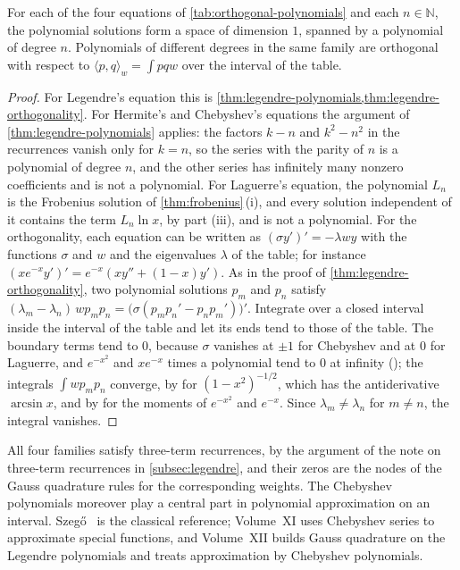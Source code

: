 \begin{proposition}
\label{prop:classical-polynomials}
For each of the four equations of \cref{tab:orthogonal-polynomials} and each $n\in\mathbb N$, the polynomial solutions form a space of dimension $1$, spanned by a polynomial of degree $n$. Polynomials of different degrees in the same family are orthogonal with respect to $\langle p,q\rangle_w=\int pqw$ over the interval of the table.
\end{proposition}

\begin{proof}
For Legendre's equation this is \cref{thm:legendre-polynomials,thm:legendre-orthogonality}. For Hermite's and Chebyshev's equations the argument of \cref{thm:legendre-polynomials} applies: the factors $k-n$ and $k^2-n^2$ in the recurrences vanish only for $k=n$, so the series with the parity of $n$ is a polynomial of degree $n$, and the other series has infinitely many nonzero coefficients and is not a polynomial. For Laguerre's equation, the polynomial $L_n$ is the Frobenius solution of \cref{thm:frobenius}\,(i), and every solution independent of it contains the term $L_n\ln x$, by part (iii), and is not a polynomial. For the orthogonality, each equation can be written as $(\sigma y')'=-\lambda wy$ with the functions $\sigma$ and $w$ and the eigenvalues $\lambda$ of the table; for instance $(xe^{-x}y')'=e^{-x}(xy''+(1-x)y')$. As in the proof of \cref{thm:legendre-orthogonality}, two polynomial solutions $p_m$ and $p_n$ satisfy $(\lambda_m-\lambda_n)\,wp_mp_n=\bigl(\sigma(p_mp_n'-p_np_m')\bigr)'$. Integrate over a closed interval inside the interval of the table and let its ends tend to those of the table. The boundary terms tend to $0$, because $\sigma$ vanishes at $\pm1$ for Chebyshev and at $0$ for Laguerre, and $e^{-x^2}$ and $xe^{-x}$ times a polynomial tend to $0$ at infinity (); the integrals $\int wp_mp_n$ converge, by  for $(1-x^2)^{-1/2}$, which has the antiderivative $\arcsin x$, and by  for the moments of $e^{-x^2}$ and $e^{-x}$. Since $\lambda_m\ne\lambda_n$ for $m\ne n$, the integral vanishes.
\end{proof}

All four families satisfy three-term recurrences, by the argument of the note on three-term recurrences in \cref{subsec:legendre}, and their zeros are the nodes of the Gauss quadrature rules for the corresponding weights. The Chebyshev polynomials moreover play a central part in polynomial approximation on an interval. Szeg\H{o}~\cite{szego1975} is the classical reference; Volume~XI uses Chebyshev series to approximate special functions, and Volume~XII builds Gauss quadrature on the Legendre polynomials and treats approximation by Chebyshev polynomials.

